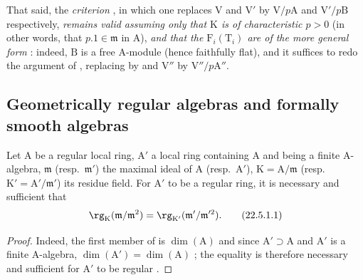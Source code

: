 \begin{remark}[22.4.8]
That said, the \emph{criterion} , in which one replaces $\mathrm{V}$ and $\mathrm{V}'$ by $\mathrm{V}/p\mathrm{A}$ and $\mathrm{V}'/p\mathrm{B}$ respectively, \emph{remains valid assuming only that $\mathrm{K}$ is of characteristic $p>0$} (in other words, that $p.1\in\mathfrak{m}$ in $\mathrm{A}$), \emph{and that the $\mathrm{F}_i(\mathrm{T}_i)$ are of the more general form} : indeed, $\mathrm{B}$ is a free $\mathrm{A}$-module (hence faithfully flat), and it suffices to redo the argument of , replacing  by  and $\mathrm{V}''$ by $\mathrm{V}''/p\mathrm{A}''$.
\end{remark}

\subsection{Geometrically regular algebras and formally smooth algebras}
\label{subsection:0.22.5}

\begin{proposition}[22.5.1]
\label{0.22.5.1}
Let $\mathrm{A}$ be a regular local ring, $\mathrm{A}'$ a local ring containing $\mathrm{A}$ and being a finite $\mathrm{A}$-algebra, $\mathfrak{m}$ (resp.~$\mathfrak{m}'$) the maximal ideal of $\mathrm{A}$ (resp.~$\mathrm{A}'$), $\mathrm{K}=\mathrm{A}/\mathfrak{m}$ (resp.~$\mathrm{K}'=\mathrm{A}'/\mathfrak{m}'$) its residue field.
For $\mathrm{A}'$ to be a regular ring, it is necessary and sufficient that
\[
\label{0.22.5.1.1}
  \rg_\mathrm{K}(\mathfrak{m}/\mathfrak{m}^2)=\rg_{\mathrm{K}'}(\mathfrak{m}'/\mathfrak{m}'^2).
  \tag{22.5.1.1}
\]
\end{proposition}

\begin{proof}
Indeed, the first member of  is $\dim(\mathrm{A})$  and since $\mathrm{A}'\supset\mathrm{A}$ and $\mathrm{A}'$ is a finite $\mathrm{A}$-algebra, $\dim(\mathrm{A}')=\dim(\mathrm{A})$ ; the equality  is therefore necessary and sufficient for $\mathrm{A}'$ to be regular .
\end{proof}

